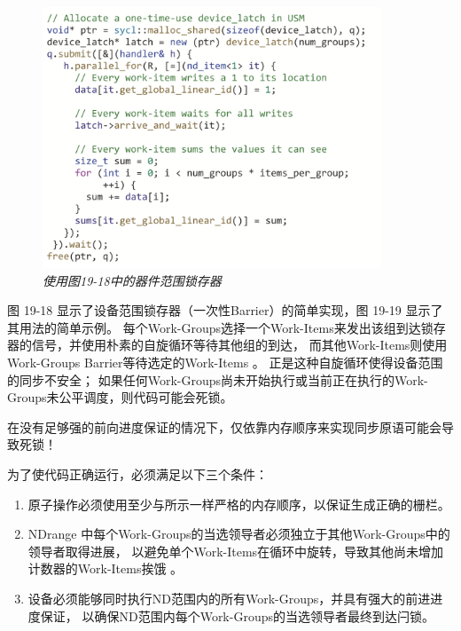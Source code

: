 \begin{figure}[H]
	\centering
	\includegraphics[width=0.9\textwidth]{figs/F19.19.png}
	\caption{\textit{使用图19-18中的器件范围锁存器 }}
\end{figure}

图 19-18 显示了设备范围锁存器（一次性Barrier）的简单实现，图 19-19 显示了其用法的简单示例。 
每个Work-Groups选择一个Work-Items来发出该组到达锁存器的信号，并使用朴素的自旋循环等待其他组的到达，
而其他Work-Items则使用Work-Groups Barrier等待选定的Work-Items 。 
正是这种自旋循环使得设备范围的同步不安全； 
如果任何Work-Groups尚未开始执行或当前正在执行的Work-Groups未公平调度，则代码可能会死锁。

\begin{remark}
	在没有足够强的前向进度保证的情况下，仅依靠内存顺序来实现同步原语可能会导致死锁！
\end{remark}

为了使代码正确运行，必须满足以下三个条件：

\begin{enumerate}
	\item 原子操作必须使用至少与所示一样严格的内存顺序，以保证生成正确的栅栏。

	\item NDrange 中每个Work-Groups的当选领导者必须独立于其他Work-Groups中的领导者取得进展，
	以避免单个Work-Items在循环中旋转，导致其他尚未增加计数器的Work-Items挨饿 。

	\item 设备必须能够同时执行ND范围内的所有Work-Groups，并具有强大的前进进度保证，
	以确保ND范围内每个Work-Groups的当选领导者最终到达闩锁。
\end{enumerate}


